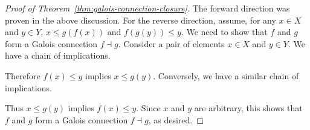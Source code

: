\documentclass[../main.tex]{subfiles}
\begin{document}
\begin{proof}[Proof of Theorem~\ref{thm:galois-connection-closure}]
  The forward direction was proven in the above discussion. For the reverse
  direction, assume, for any \(x \in X\) and \(y \in Y\), \(x \leq g(f(x))\) and
  \(f(g(y)) \leq y\). We need to show that \(f\) and \(g\) form a Galois
  connection \(f \dashv g\). Consider a pair of elements \(x \in X\) and \(y \in
  Y\). We have a chain of implications.
  \begin{prooftree}
  \end{prooftree}
  Therefore \(f(x) \leq y\) implies \(x \leq g(y)\). Conversely, we have a
  similar chain of implications.
  \begin{prooftree}
  \end{prooftree}
  Thus \(x \leq g(y)\) implies \(f(x) \leq y\). Since \(x\) and \(y\) are
  arbitrary, this shows that \(f\) and \(g\) form a Galois connection \(f \dashv
  g\), as desired.
\end{proof}
\end{document}

